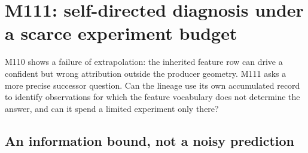 \section{M111: self-directed diagnosis under a scarce experiment budget}
\label{sec:m111}
M110 shows a failure of extrapolation: the inherited feature row can drive a confident but wrong attribution outside the producer geometry. M111 asks a more precise successor question. Can the lineage use its own accumulated record to identify observations for which the feature vocabulary does not determine the answer, and can it spend a limited experiment only there?

\subsection{An information bound, not a noisy prediction}
